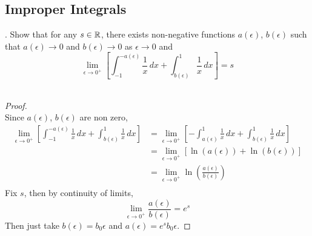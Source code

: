 \documentclass[a4paper]{article}
\begin{document}
\subsection{Improper Integrals}
\begin{qtn}{}{}
\thetcbcounter.\;\; Show that for any $s\in\mathbb{R}$, there exists non-negative functions $a(\epsilon)$, $b(\epsilon)$ such that $a(\epsilon)\to 0$ and $b(\epsilon)\to 0$ as $\epsilon\to 0$ and $$\lim_{\epsilon\to0^+}\left[\int_{-1}^{-a(\epsilon)}\frac{1}{x}\,dx+\int_{b(\epsilon)}^1\frac{1}{x}\,dx\right]=s$$\\\hspace*{\fill}\cite{R0002}\tcbline
\begin{proof}~\\
Since $a(\epsilon)$, $b(\epsilon)$ are non zero, 
\begin{align*}
\lim_{\epsilon\to0^+}\left[\int_{-1}^{-a(\epsilon)}\frac{1}{x}\,dx+\int_{b(\epsilon)}^1\frac{1}{x}\,dx\right]&=\lim_{\epsilon\to0^+}\left[-\int_{a(\epsilon)}^{1}\frac{1}{x}\,dx+\int_{b(\epsilon)}^1\frac{1}{x}\,dx\right]\\
&=\lim_{\epsilon\to0^+}\left[\ln(a(\epsilon))+\ln(b(\epsilon))\right]\\
&=\lim_{\epsilon\to0^+}\ln\left(\frac{a(\epsilon)}{b(\epsilon)}\right)\\
\end{align*}
Fix $s$, then by continuity of limits, $$\lim_{\epsilon\to 0^+}\frac{a(\epsilon)}{b(\epsilon)}=e^s$$ Then just take $b(\epsilon)=b_0\epsilon$ and $a(\epsilon)=e^sb_0\epsilon$. 
\end{proof}
\end{qtn}
\end{document}

